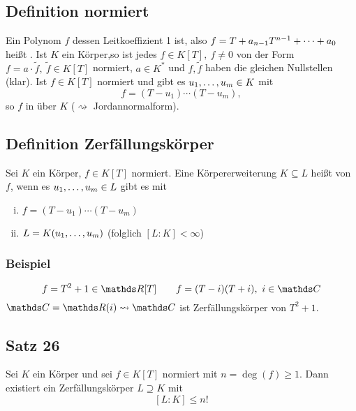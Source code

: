 \subsection{Definition normiert}
\label{sub:def_normiert}
Ein Polynom $f$ dessen Leitkoeffizient 1 ist, also $f=T+a_{n-1}T^{n-1}+ \dots +a_0$ heißt .
Ist $K$ ein Körper,so ist jedes $f\in K[T],~f\neq 0$ von der Form $f=a\cdot \tilde{f},~\tilde{f}\in K[T]$ normiert, $a\in K^*$ und $f,\tilde{f}$ haben die gleichen Nullstellen (klar).
Ist $f\in K[T]$ normiert und gibt es $u_1, \dots ,u_m\in K$ mit
\[
f=(T-u_1)\cdots(T-u_m),
\]
so  $f$ in  über $K$ ($\rightsquigarrow$ Jordannormalform).

\subsection{Definition Zerfällungskörper}
\label{sub:def_zerfaellungskoerper}
Sei $K$ ein Körper, $f\in K[T]$ normiert.
Eine Körpererweiterung $K\subseteq L$ heißt  von $f$, wenn es $u_1, \dots ,u_m\in L$ gibt es mit
\begin{enumerate}[(i)]
	\item $f=(T-u_1)\cdots(T-u_m)$
	\item $L=K(u_1, \dots ,u_m)$ (folglich $[L:K]<\infty$)
\end{enumerate}

\subsubsection*{Beispiel}
\[
f=T^2+1\in \R[T]\qquad f=(T-i)(T+i),~i\in \C
\]
$\C=\R(i)\rightsquigarrow \C$ ist Zerfällungskörper von $T^2+1$.

\subsection{Satz 26}
\label{sub:satz_26}
Sei $K$ ein Körper und sei $f\in K[T]$ normiert mit $n=\deg(f)\ge 1$.
Dann existiert ein Zerfällungskörper $L\supseteq K$ mit 
\[
[L:K]\le n!
\]

